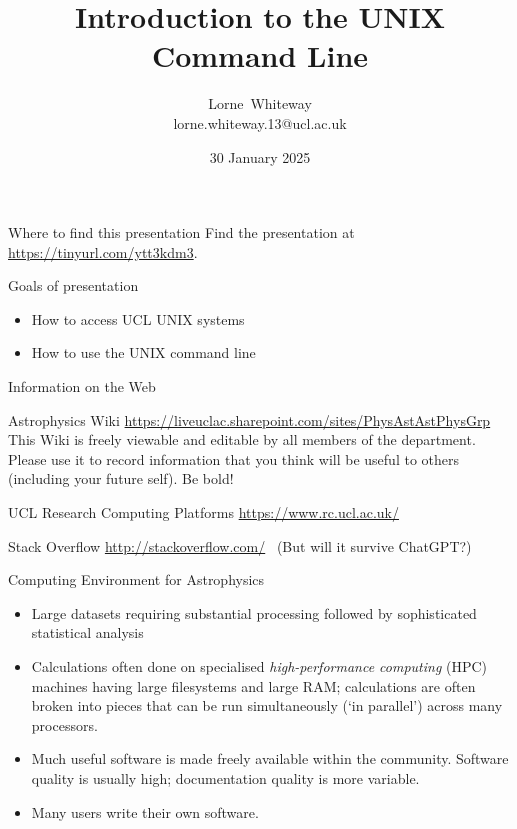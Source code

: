 \documentclass[dvipsnames]{beamer}
\title{Introduction to the UNIX Command Line}
\author{Lorne~Whiteway \\ lorne.whiteway.13@ucl.ac.uk}
\institute{Astrophysics Group\\  Department of Physics and Astronomy\\  University College London}
\date{30 January 2025}
\begin{document}
\frame{\titlepage}

\begin{frame}{Where to find this presentation}
    Find the presentation at \alert{\url{https://tinyurl.com/ytt3kdm3}}.\\
\end{frame}


\begin{frame}{Goals of presentation}
  \begin{itemize}
    \item How to access UCL UNIX systems
    \item How to use the UNIX command line
  \end{itemize}
\end{frame}


\begin{frame}{Information on the Web}
  \begin{block}{Astrophysics Wiki}
    \url{https://liveuclac.sharepoint.com/sites/PhysAstAstPhysGrp}
    This Wiki is freely viewable and editable by all members of the department. Please use it to record information that you think will be useful to others (including your future self). Be bold!
  \end{block}
  \begin{block}{UCL Research Computing Platforms}
    \url{https://www.rc.ucl.ac.uk/}
  \end{block}
  \begin{block}{Stack Overflow}
    \url{http://stackoverflow.com/}  \ (But will it survive ChatGPT?)
  \end{block}
\end{frame}


\begin{frame}{Computing Environment for Astrophysics}
  \begin{itemize}
  \item Large datasets requiring substantial processing followed by sophisticated statistical analysis
  \item Calculations often done on specialised \textit{high-performance computing} (HPC) machines having large filesystems and large RAM; calculations are often broken into pieces that can be run simultaneously (`in parallel') across many processors.
  \item Much useful software is made freely available within the community. Software quality is usually high; documentation quality is more variable.
  \item Many users write their own software.
  \end{itemize}
\end{frame}
\end{document}
